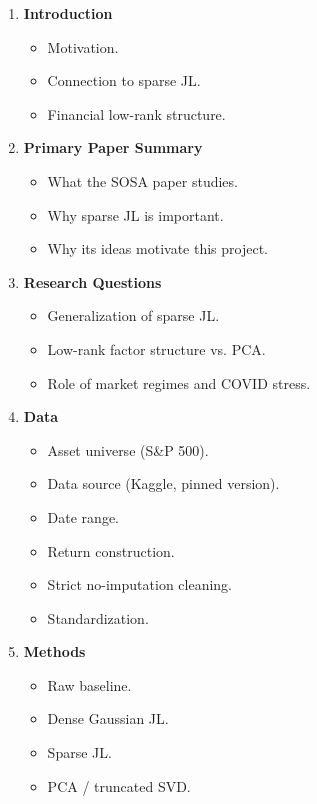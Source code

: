 \documentclass[11pt]{article}
\begin{document}
\begin{enumerate}
    \item \textbf{Introduction}
    \begin{itemize}
        \item Motivation.
        \item Connection to sparse JL.
        \item Financial low-rank structure.
    \end{itemize}

    \item \textbf{Primary Paper Summary}
    \begin{itemize}
        \item What the SOSA paper studies.
        \item Why sparse JL is important.
        \item Why its ideas motivate this project.
    \end{itemize}

    \item \textbf{Research Questions}
    \begin{itemize}
        \item Generalization of sparse JL.
        \item Low-rank factor structure vs. PCA.
        \item Role of market regimes and COVID stress.
    \end{itemize}

    \item \textbf{Data}
    \begin{itemize}
        \item Asset universe (S\&P 500).
        \item Data source (Kaggle, pinned version).
        \item Date range.
        \item Return construction.
        \item Strict no-imputation cleaning.
        \item Standardization.
    \end{itemize}

    \item \textbf{Methods}
    \begin{itemize}
        \item Raw baseline.
        \item Dense Gaussian JL.
        \item Sparse JL.
        \item PCA / truncated SVD.
    \end{itemize}


\end{enumerate}
\end{document}
